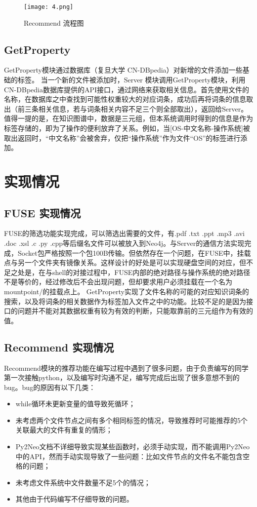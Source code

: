 \documentclass[UTF8]{ctexart}
\begin{document}
\begin{figure}
\centering\texttt{[image: 4.png]}
\caption{Recommend 流程图}
\end{figure}

\subsection{GetProperty}
GetProperty模块通过数据库（复旦大学 CN-DBpedia）对新增的文件添加一些基础的标签。
当一个新的文件被添加时，Server 模块调用GetProperty模块，利用CN-DBpedia数据库提供的API接口，通过网络来获取相关信息。首先使用文件的名称，在数据库之中查找到可能性权重较大的对应词条，成功后再将词条的信息取出（前三条相关信息，若与词条相关内容不足三个则全部取出），返回给Server。值得一提的是，在知识图谱中，数据是三元组，但本系统调用时得到的信息是作为标签存储的，即为了操作的便利放弃了关系。例如，当[OS-中文名称-操作系统]被取出返回时，“中文名称”会被舍弃，仅把“操作系统”作为文件“OS”的标签进行添加。

\section{实现情况}
\subsection{FUSE 实现情况}
FUSE的筛选功能实现完成，可以筛选出需要的文件，有.pdf .txt .ppt .mp3 .avi .doc .xsl .c .py .cpp等后缀名文件可以被放入到Neo4j。与Server的通信方法实现完成，Socket包严格按照一个包100B传输。但依然存在一个问题，在FUSE中，挂载点与另一个文件夹有镜像关系。这样设计的好处是可以实现硬盘空间的对应，但不足之处是，在与shell的对接过程中，FUSE内部的绝对路径与操作系统的绝对路径不是等价的，经过修改后不会出现问题，但却要求用户必须挂载在一个名为mountpoint/的挂载点上。
GetProperty实现了文件名称的可能的对应知识词条的搜索，以及将词条的相关数据作为标签加入文件之中的功能。比较不足的是因为接口的问题并不能对其数据权重有较为有效的判断，只能取靠前的三元组作为有效的值。

\subsection{Recommend 实现情况}
Recommend模块的推荐功能在编写过程中遇到了很多问题，由于负责编写的同学第一次接触python，以及编写时沟通不足，编写完成后出现了很多意想不到的bug。bug的原因有以下几类：

\begin{itemize}
  \item while循环未更新变量的值导致死循环；
  \item 未考虑两个文件节点之间有多个相同标签的情况，导致推荐时可能推荐的5个关联最大的文件有重复的情形；
   \item Py2Neo文档不详细导致实现某些函数时，必须手动实现，而不能调用Py2Neo中的API，然而手动实现导致了一些问题：比如文件节点的文件名不能包含空格的问题；
  \item 未考虑文件系统中文件数量不足5个的情况；
  \item 其他由于代码编写不仔细导致的问题。
\end{itemize}
\end{document}
